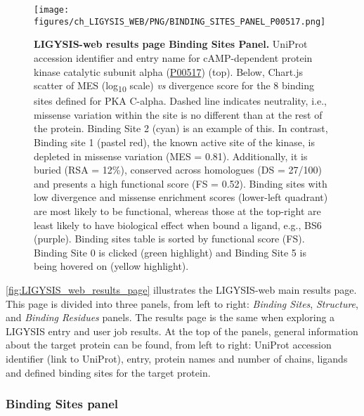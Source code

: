 \begin{figure}[htb!]
    \centering
    \texttt{[image: figures/ch\_LIGYSIS\_WEB/PNG/BINDING\_SITES\_PANEL\_P00517.png]}
    \caption[LIGYSIS-web results page Binding Sites Panel]{\textbf{LIGYSIS-web results page Binding Sites Panel.} UniProt accession identifier and entry name for cAMP-dependent protein kinase catalytic subunit alpha (\href{https://www.uniprot.org/uniprotkb/P00517/entry}{P00517}) (top). Below, Chart.js scatter of MES (log\textsubscript{10} scale) \textit{vs} divergence score for the 8 binding sites defined for PKA C-alpha. Dashed line indicates neutrality, i.e., missense variation within the site is no different than at the rest of the protein. Binding Site 2 (cyan) is an example of this. In contrast, Binding site 1 (pastel red), the known active site of the kinase, is depleted in missense variation (MES = 0.81). Additionally, it is buried (RSA = 12\%), conserved across homologues (DS = 27/100) and presents a high functional score (FS = 0.52). Binding sites with low divergence and missense enrichment scores (lower-left quadrant) are most likely to be functional, whereas those at the top-right are least likely to have biological effect when bound a ligand, e.g., BS6 (purple). Binding sites table is sorted by functional score (FS). Binding Site 0 is clicked (green highlight) and Binding Site 5 is being hovered on (yellow highlight).}
    \label{fig:LIGYSIS_web_BINDING_SITES_PANEL}
\end{figure}

\autoref{fig:LIGYSIS_web_results_page} illustrates the LIGYSIS-web main results page. This page is divided into three panels, from left to right: \textit{Binding Sites}, \textit{Structure}, and \textit{Binding Residues} panels. The results page is the same when exploring a LIGYSIS entry and user job results. At the top of the panels, general information about the target protein can be found, from left to right: UniProt accession identifier (link to UniProt), entry, protein names and number of chains, ligands and defined binding sites for the target protein.

\subsubsection{Binding Sites panel}

